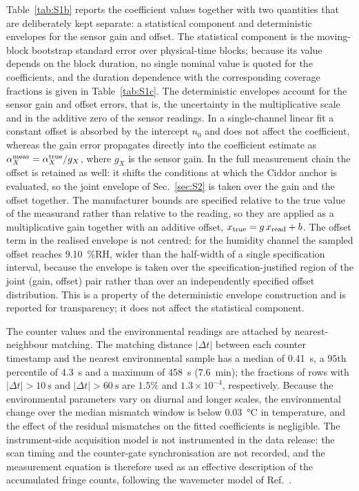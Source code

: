 \documentclass[aps,prapplied,reprint,superscriptaddress]{revtex4-2}
\begin{document}
Table~\ref{tab:S1b} reports the coefficient values together with two quantities that are deliberately kept separate: a statistical component and deterministic envelopes for the sensor gain and offset. The statistical component is the moving-block bootstrap standard error over physical-time blocks; because its value depends on the block duration, no single nominal value is quoted for the coefficients, and the duration dependence with the corresponding coverage fractions is given in Table~\ref{tab:S1c}. The deterministic envelopes account for the sensor gain and offset errors, that is, the uncertainty in the multiplicative scale and in the additive zero of the sensor readings. In a single-channel linear fit a constant offset is absorbed by the intercept $n_0$ and does not affect the coefficient, whereas the gain error propagates directly into the coefficient estimate as $\alpha_X^{\rm meas} = \alpha_X^{\rm true}/g_X$, where $g_X$ is the sensor gain. In the full measurement chain the offset is retained as well: it shifts the conditions at which the Ciddor anchor is evaluated, so the joint envelope of Sec.~\ref{sec:S2} is taken over the gain and the offset together. The manufacturer bounds are specified relative to the true value of the measurand rather than relative to the reading, so they are applied as a multiplicative gain together with an additive offset, $x_{\rm true} = g\,x_{\rm read} + b$. The offset term in the realised envelope is not centred: for the humidity channel the sampled offset reaches \SI{9.10}{\percent}RH, wider than the half-width of a single specification interval, because the envelope is taken over the specification-justified region of the joint (gain, offset) pair rather than over an independently specified offset distribution. This is a property of the deterministic envelope construction and is reported for transparency; it does not affect the statistical component.

The counter values and the environmental readings are attached by nearest-neighbour matching. The matching distance $|\Delta t|$ between each counter timestamp and the nearest environmental sample has a median of \SI{0.41}{\second}, a $95$th percentile of \SI{4.3}{\second} and a maximum of \SI{458}{\second} ($7.6$~min); the fractions of rows with $|\Delta t| > \SI{10}{\second}$ and $|\Delta t| > \SI{60}{\second}$ are $1.5\%$ and $1.3\times10^{-4}$, respectively. Because the environmental parameters vary on diurnal and longer scales, the environmental change over the median mismatch window is below \SI{0.03}{\celsius} in temperature, and the effect of the residual mismatches on the fitted coefficients is negligible. The instrument-side acquisition model is not instrumented in the data release: the scan timing and the counter-gate synchronisation are not recorded, and the measurement equation is therefore used as an effective description of the accumulated fringe counts, following the wavemeter model of Ref.~\cite{fox1999reliable}.
\end{document}
